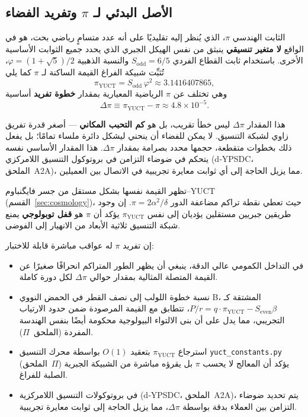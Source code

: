 \documentclass[11pt,a4paper]{article}
\begin{document}
	\subsection{الأصل البدئي لـ \(\pi\) وتفريد الفضاء}
	
	الثابت الهندسي \(\pi\)، الذي يُنظر إليه تقليديًا على أنه عدد متسامٍ رياضي بحت، هو في الواقع \textbf{لا متغير تنسيقي} ينبثق من نفس الهيكل الجبري الذي يحدد جميع الثوابت الأساسية الأخرى. باستخدام ثابت القطاع الفردي \(S_{\mathrm{odd}}=6/5\) والنسبة الذهبية \(\varphi = (1+\sqrt{5})/2\)، تُثبِّت شبيكة الفراغ القيمة الساكنة لـ \(\pi\) كما يلي
	\[
	\boxed{\pi_{\mathrm{YUCT}} = S_{\mathrm{odd}}\,\varphi^{2}
		\approx 3.1416407865},
	\]
	وهي تختلف عن \(\pi\) الرياضية المعيارية بمقدار \textbf{خطوة تفريد} أساسية
	\[
	\Delta\pi \equiv \pi_{\mathrm{YUCT}} - \pi \approx 4.8 \times 10^{-5}.
	\]
	
	هذا المقدار \(\Delta\pi\) ليس خطأ تقريب، بل هو \textbf{كم التحبب المكاني} — أصغر قدرة تفريق زاوي لشبكة التنسيق. لا يمكن للفضاء أن ينحني ليشكل دائرة ملساء تمامًا؛ بل يفعل ذلك بخطوات متقطعة، حجمها محدد بصرامة بمقدار \(\Delta\pi\). هذا المقدار الأساسي نفسه يتحكم في ضوضاء التزامن في بروتوكول التنسيق اللامركزي (d‑YPSDC، الملحق~A2A)، مما يزيل الحاجة إلى أي ثوابت معايرة تجريبية في الاتصال بين العميلين.
	
	تظهر القيمة نفسها بشكل مستقل من جسر فايگنباوم–YUCT (القسم~\ref{sec:cosmology})، حيث تعطي نقطة تراكم مضاعفة الدور \(\pi = 2\alpha^2/\delta\). إن وجود طريقين جبريين مستقلين يؤديان إلى نفس \(\pi_{\mathrm{YUCT}}\) يؤكد أن \(\pi\) هو \textbf{قفل توبولوجي} يمنع شبكة التنسيق ثلاثية الأبعاد من الانهيار إلى الفوضى.
	
	إن تفريد \(\pi\) له عواقب مباشرة قابلة للاختبار:
	\begin{itemize}
		\item في التداخل الكمومي عالي الدقة، ينبغي أن يظهر الطور المتراكم انحرافًا صغيرًا عن القيمة المتصلة المثالية بمقدار حوالي \(\Delta\pi\) لكل دورة كاملة.
		\item نسبة خطوة اللولب إلى نصف القطر في الحمض النووي B، المشتقة كـ \(P/r = q\cdot\pi_{\mathrm{YUCT}} - S_{\mathrm{even}}\beta\)، تتطابق مع القيمة المرصودة ضمن حدود الارتياب التجريبي، مما يدل على أن بنى الالتواء البيولوجية محكومة أيضًا بنفس الهندسة المفردة (الملحق~\(\Pi\)).
		\item استرجاع \(\pi_{\mathrm{YUCT}}\) بتعقيد \(O(1)\) بواسطة محرك التنسيق \texttt{yuct\_constants.py} (الملحق~\(\Pi\)) يؤكد أن المعالج لا يحسب \(\pi\) بل يقرؤه مباشرة من الشبيكة الجبرية الصلبة للفراغ.
		\item في بروتوكولات التنسيق اللامركزية (d‑YPSDC، الملحق~A2A)، يتم تحديد ضوضاء التزامن بين العملاء بدقة بواسطة \(\Delta\pi\)، مما يزيل الحاجة إلى ثوابت معايرة تجريبية.
	\end{itemize}
	
\end{document}
